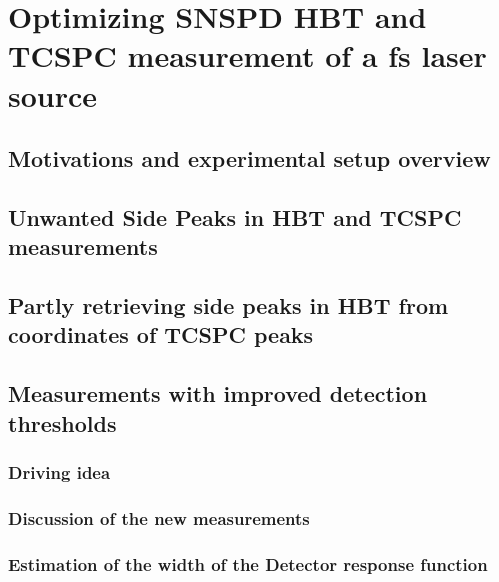 \chapter{Optimizing SNSPD HBT and TCSPC measurement of a fs laser source}


\section{Motivations and experimental setup overview}
\section{Unwanted Side Peaks in HBT and TCSPC measurements}
\section{Partly retrieving side peaks in HBT from coordinates of TCSPC peaks}
\section{Measurements with improved detection thresholds}
\subsection{Driving idea}
\subsection{Discussion of the new measurements}
\subsection{Estimation of the width of the Detector response function}